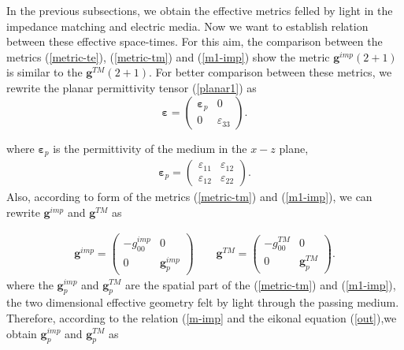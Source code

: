 \documentclass[9pt,twocolumn,twoside]{osajnl}
\begin{document}
In the previous subsections, we obtain the effective metrics felled by light in the impedance matching and electric media. Now we want to establish relation between these effective space-times. For this aim, the comparison between the metrics (\ref{metric-te}), (\ref{metric-tm}) and (\ref{m1-imp}) show the metric $\mathbf{g}^{imp}(2+1)$ is similar to the $\mathbf{g}^{TM}(2+1)$. For better comparison between these metrics, we rewrite the planar permittivity tensor (\ref{planar1}) as
\begin{equation}\label{planar2}
\boldsymbol{\varepsilon}=
        \begin{pmatrix}         
            \boldsymbol{\varepsilon}_{p}  &0\\
            0&\varepsilon_{33}        
        \end{pmatrix}.
\end{equation}

where $\boldsymbol{\varepsilon}_{p}$ is the permittivity of the medium in the $x-z$ plane,
\begin{align}\label{t-per}
        \boldsymbol{\varepsilon}_{p}=
        \begin{pmatrix}         
            \varepsilon_{11}  &\varepsilon_{12}\\
            \varepsilon_{12} &\varepsilon_{22}
        \end{pmatrix}.
\end{align}
Also, according to form of the metrics (\ref{metric-tm}) and (\ref{m1-imp}), we can rewrite $\mathbf{g}^{imp}$ and $\mathbf{g}^{TM}$ as

\begin{eqnarray}\label{m-imp}
\mathbf{g}^{imp}=
        \begin{pmatrix}         
            -g^{imp}_{00}     &0\\
            0&\mathbf{g}^{imp}_{p}
        \end{pmatrix} \qquad
    \mathbf{g}^{TM}=
        \begin{pmatrix}         
            -g_{00}^{TM}&0\\
            0&\mathbf{g}^{TM}_{p}
        \end{pmatrix}.
\end{eqnarray}
where the $\mathbf{g}^{imp}_{p}$ and $\mathbf{g}^{TM}_{p}$ are  the spatial part of the (\ref{metric-tm}) and (\ref{m1-imp}), the two dimensional effective geometry felt by light through the passing medium. Therefore, according to the relation (\ref{m-imp} and the eikonal equation (\ref{out}),we obtain $\mathbf{g}^{imp}_{p}$ and $\mathbf{g}^{TM}_{p}$ as
\end{document}
